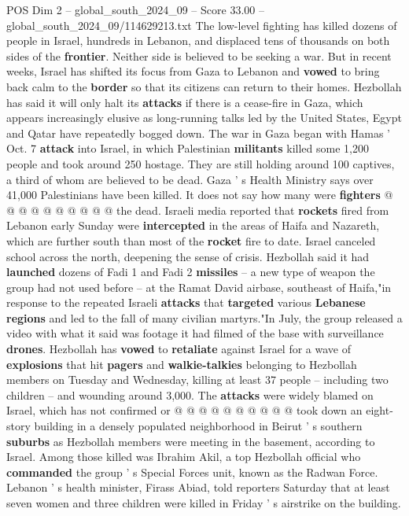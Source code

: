 \begin{textsample}{POS Dim 2 – global\_south\_2024\_09 – Score 33.00 – global\_south\_2024\_09/114629213.txt}
The low-level fighting has killed dozens of people in Israel, hundreds in Lebanon, and displaced tens of thousands on both sides of the \textbf{frontier}.
Neither side is believed to be seeking a war.
But in recent weeks, Israel has shifted its focus from Gaza to Lebanon and \textbf{vowed} to bring back calm to the \textbf{border} so that its citizens can return to their homes.
Hezbollah has said it will only halt its \textbf{attacks} if there is a cease-fire in Gaza, which appears increasingly elusive as long-running talks led by the United States, Egypt and Qatar have repeatedly bogged down.
The war in Gaza began with Hamas ' Oct. 7 \textbf{attack} into Israel, in which Palestinian \textbf{militants} killed some 1,200 people and took around 250 hostage.
They are still holding around 100 captives, a third of whom are believed to be dead.
Gaza ' s Health Ministry says over 41,000 Palestinians have been killed.
It does not say how many were \textbf{fighters} @ @ @ @ @ @ @ @ @ @ the dead.
Israeli media reported that \textbf{rockets} fired from Lebanon early Sunday were \textbf{intercepted} in the areas of Haifa and Nazareth, which are further south than most of the \textbf{rocket} fire to date.
Israel canceled school across the north, deepening the sense of crisis.
Hezbollah said it had \textbf{launched} dozens of Fadi 1 and Fadi 2 \textbf{missiles} -- a new type of weapon the group had not used before -- at the Ramat David airbase, southeast of Haifa,"in response to the repeated Israeli \textbf{attacks} that \textbf{targeted} various \textbf{Lebanese} \textbf{regions} and led to the fall of many civilian martyrs."In July, the group released a video with what it said was footage it had filmed of the base with surveillance \textbf{drones}.
Hezbollah has \textbf{vowed} to \textbf{retaliate} against Israel for a wave of \textbf{explosions} that hit \textbf{pagers} and \textbf{walkie-talkies} belonging to Hezbollah members on Tuesday and Wednesday, killing at least 37 people -- including two children -- and wounding around 3,000.
The \textbf{attacks} were widely blamed on Israel, which has not confirmed or @ @ @ @ @ @ @ @ @ @ took down an eight-story building in a densely populated neighborhood in Beirut ' s southern \textbf{suburbs} as Hezbollah members were meeting in the basement, according to Israel.
Among those killed was Ibrahim Akil, a top Hezbollah official who \textbf{commanded} the group ' s Special Forces unit, known as the Radwan Force.
Lebanon ' s health minister, Firass Abiad, told reporters Saturday that at least seven women and three children were killed in Friday ' s airstrike on the building.

\end{textsample}
